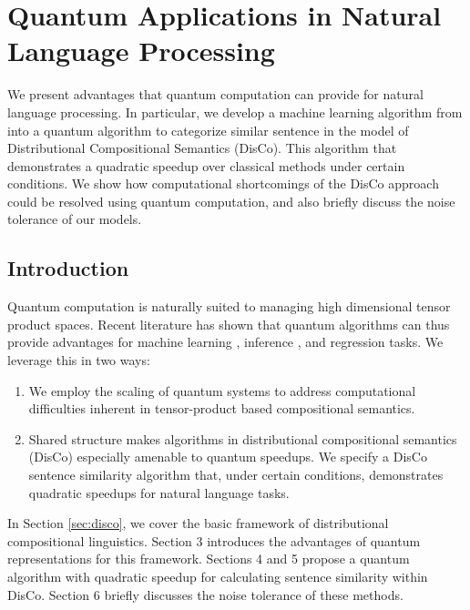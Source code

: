 \chapter{Quantum Applications in Natural Language Processing}

\begin{chapabstract}
        We present advantages that quantum computation can provide for natural language processing.  In particular, we develop a machine learning algorithm from \cite{wiebe2012quantum} into a quantum algorithm to categorize similar sentence in the model of Distributional Compositional Semantics (DisCo). This algorithm that demonstrates a quadratic speedup over classical methods under certain conditions. We show how computational shortcomings of the  DisCo approach could be resolved using quantum computation, and also briefly discuss the noise tolerance of our models.
\end{chapabstract}

\section{Introduction}

Quantum computation is naturally suited to managing high dimensional tensor product spaces. Recent literature has shown that quantum algorithms can thus provide advantages for machine learning \cite{rebentrost2014quantum}\cite{wiebe2014quantum}\cite{wiebe2014quantumDeepLearning}, inference \cite{low2014quantum}, and regression \cite{wang2014quantum}\cite{wiebe2012quantum} tasks.  We leverage this in two ways:
\begin{enumerate}
\item We employ the scaling of quantum systems to address computational difficulties inherent in tensor-product based compositional semantics.
\item Shared structure makes algorithms in distributional compositional semantics (DisCo)\cite{clark2008compositional} especially amenable to quantum speedups.  We specify a DisCo sentence similarity algorithm that, under certain conditions, demonstrates quadratic speedups for natural language tasks.
\end{enumerate}

In Section \ref{sec:disco}, we cover the basic framework of distributional compositional linguistics. Section 3 introduces the advantages of quantum representations for this framework.  Sections 4 and 5 propose a quantum algorithm with quadratic speedup for calculating sentence similarity within DisCo. Section 6 briefly discusses the noise tolerance of these methods.


